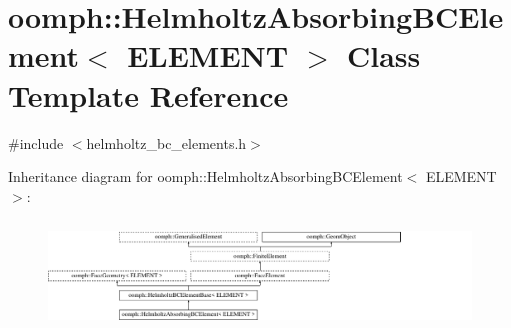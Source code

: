 \hypertarget{classoomph_1_1HelmholtzAbsorbingBCElement}{}\section{oomph\+:\+:Helmholtz\+Absorbing\+B\+C\+Element$<$ E\+L\+E\+M\+E\+NT $>$ Class Template Reference}
\label{classoomph_1_1HelmholtzAbsorbingBCElement}


{\ttfamily \#include $<$helmholtz\+\_\+bc\+\_\+elements.\+h$>$}

Inheritance diagram for oomph\+:\+:Helmholtz\+Absorbing\+B\+C\+Element$<$ E\+L\+E\+M\+E\+NT $>$\+:\begin{figure}[H]
\begin{center}
\leavevmode
\includegraphics[height=2.935010cm]{classoomph_1_1HelmholtzAbsorbingBCElement}
\end{center}
\end{figure}
